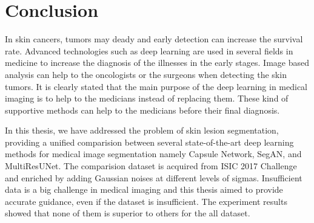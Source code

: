 \chapter{Conclusion}

    In skin cancers, tumors may deady and early detection can increase the survival rate.
    Advanced technologies such as deep learning are used in several fields in medicine to increase the diagnosis of the illnesses in the early stages.
    Image based analysis can help to the oncologists or the surgeons when detecting the skin tumors.
    It is clearly stated that the main purpose of the deep learning in medical imaging is to help to the medicians instead of replacing them.
    These kind of supportive methods can help to the medicians before their final diagnosis.

    In this thesis, we have addressed the problem of skin lesion segmentation, providing a unified comparision between several  state-of-the-art deep learning methods
    for medical image segmentation namely Capsule Network, SegAN, and MultiResUNet.
    The comparision dataset is acquired from ISIC 2017 Challenge and enriched by adding Gaussian noises at different levels of sigmas.
    Insufficient data is a big challenge in medical imaging and this thesis aimed to provide accurate guidance, even if the dataset is insufficient.
    The experiment results showed that none of them is superior to others for the all dataset.
